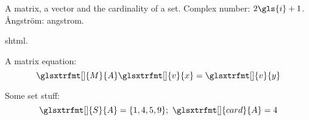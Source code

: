 \documentclass{report}
\newcommand{\gmtx}[2][]{\glsxtrfmt[#1]{M}{#2}}
\newcommand{\gvec}[2][]{\glsxtrfmt[#1]{v}{#2}}
\newcommand{\gset}[2][]{\glsxtrfmt[#1]{S}{#2}}
\newcommand{\gcard}[2][]{\glsxtrfmt[#1]{card}{#2}}
\begin{document}
A \gls{matrix}, a \gls{vector} and the \gls{cardinality}
of a \gls{set}. Complex number: $2\gls{i}+1$.
\AA ngstr\"om: \gls{angstrom}.

\gls{shtml}.

A \gls{matrix} equation:
\[
 \gmtx{A}\gvec{x} = \gvec{y}
\]

Some \gls{set} stuff:
\[
 \gset{A} = \{1, 4, 5, 9\};\ \gcard{A} = 4
\]

\printunsrtglossaries
\end{document}
